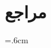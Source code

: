 \renewcommand{\bibname}{مراجع}	
{\normalfont\huge\bfseries\RTL}
\chapter*{\vspace*{8cm}مراجع}
\baselineskip=.6cm
\newpage
\begin{LTRitems}
	\resetlatinfont
	\begingroup
	\def\chapter*#1{}
	‎‎
	{\normalsize}
	\endgroup
\end{LTRitems}


\baselineskip=0.67cm
